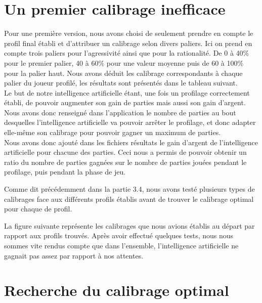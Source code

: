 \documentclass{report}
\begin{document}
\section{Un premier calibrage inefficace}

Pour une première version, nous avons choisi de seulement prendre en compte le profil final établi et d'attribuer un calibrage selon divers paliers. Ici on prend en compte trois paliers pour l'agressivité ainsi que pour la rationalité. De 0 à 40\% pour le premier palier, 40 à 60\% pour une valeur moyenne puis de 60 à 100\% pour la palier haut. Nous avons déduit les calibrage correspondants à chaque palier du joueur profilé, les résultats sont présentés dans le tableau suivant.\\

\hspace{0.5cm}Le but de notre intelligence artificielle étant, une fois un profilage correctement établi, de pouvoir augmenter son gain de parties mais aussi son gain d'argent. Nous avons donc renseigné dans l'application le nombre de parties au bout desquelles l'intelligence artificielle va pouvoir arrêter le profilage, et donc adapter elle-même son calibrage pour pouvoir gagner un maximum de parties.\\

Nous avons donc ajouté dans les fichiers résultats le gain d'argent de l'intelligence artificielle pour chacune des parties. Ceci nous a permis de pouvoir obtenir un ratio du nombre de parties gagnées sur le nombre de parties jouées pendant le profilage, puis pendant la phase de jeu.\par

Comme dit précédemment dans la partie 3.4, nous avons testé plusieurs types de calibrages face aux différents profils établis avant de trouver le calibrage optimal pour chaque de profil. 

La figure suivante représente les calibrages que nous avions établis au départ par rapport aux profils trouvés. Après avoir effectué quelques tests, nous nous sommes vite rendus compte que dans l'ensemble, l'intelligence artificielle ne gagnait pas assez par rapport à nos attentes. 



\section{Recherche du calibrage optimal}
\end{document}
